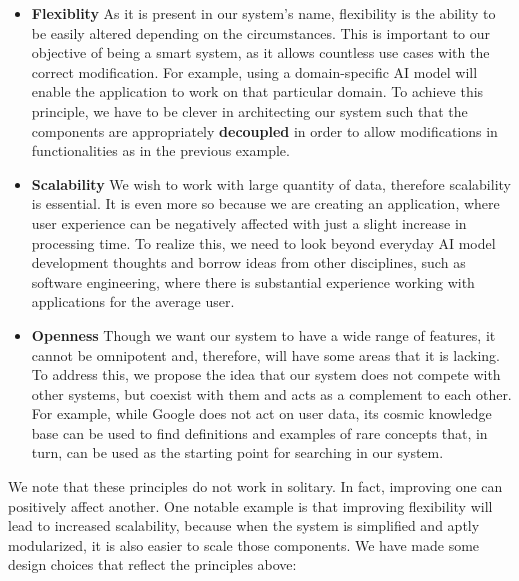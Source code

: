 \begin{itemize}
\vspace{-2mm}
    \item \textbf{Flexiblity} \quad As it is present in our system's name, flexibility is the ability to be easily altered depending on the circumstances. This is important to our objective of being a smart system, as it allows countless use cases with the correct modification. For example, using a domain-specific AI model will enable the application to work on that particular domain. To achieve this principle, we have to be clever in architecting our system such that the components are appropriately \textbf{decoupled} in order to allow modifications in functionalities as in the previous example.
\vspace{-2mm}    
    \item \textbf{Scalability} \quad We wish to work with large quantity of data, therefore scalability is essential. It is even more so because we are creating an application, where user experience can be negatively affected with just a slight increase in processing time. To realize this, we need to look beyond everyday AI model development thoughts and borrow ideas from other disciplines, such as software engineering, where there is substantial experience working with applications for the average user.
\vspace{-2mm}    
    \item \textbf{Openness} \quad Though we want our system to have a wide range of features, it cannot be omnipotent and, therefore, will have some areas that it is lacking. To address this, we propose the idea that our system does not compete with other systems, but coexist with them and acts as a complement to each other. For example, while Google does not act on user data, its cosmic knowledge base can be used to find definitions and examples of rare concepts that, in turn, can be used as the starting point for searching in our system.
\end{itemize}

\vspace{-2mm}
We note that these principles do not work in solitary. In fact, improving one can positively affect another. One notable example is that improving flexibility will lead to increased scalability, because when the system is simplified and aptly modularized, it is also easier to scale those components. We have made some design choices that reflect the principles above:

